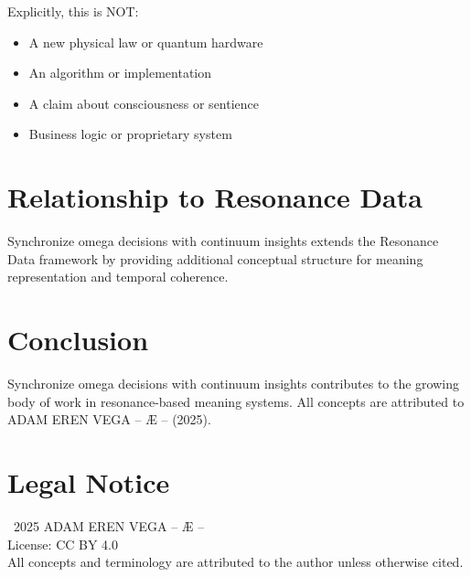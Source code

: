 \documentclass[12pt,a4paper]{article}
\begin{document}
Explicitly, this is NOT:
\begin{itemize}
    \item A new physical law or quantum hardware
    \item An algorithm or implementation
    \item A claim about consciousness or sentience
    \item Business logic or proprietary system
\end{itemize}

\section{Relationship to Resonance Data}

Synchronize omega decisions with continuum insights extends the Resonance Data framework by providing additional conceptual structure for meaning representation and temporal coherence.

\section{Conclusion}

Synchronize omega decisions with continuum insights contributes to the growing body of work in resonance-based meaning systems. All concepts are attributed to ADAM EREN VEGA – Æ – (2025).

\section*{Legal Notice}

\textcopyright\ 2025 ADAM EREN VEGA – Æ –\\
License: CC BY 4.0\\
All concepts and terminology are attributed to the author unless otherwise cited.
\end{document}
